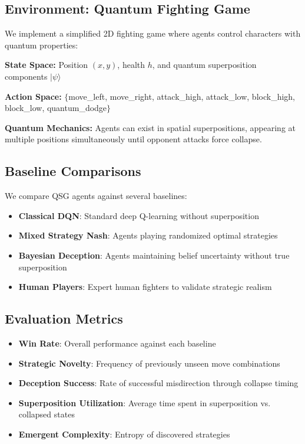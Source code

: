 \documentclass[11pt,a4paper]{article}
\begin{document}
\subsection{Environment: Quantum Fighting Game}

We implement a simplified 2D fighting game where agents control characters with quantum properties:

\textbf{State Space:} Position $(x,y)$, health $h$, and quantum superposition components $|\psi\rangle$

\textbf{Action Space:} $\{$move\_left, move\_right, attack\_high, attack\_low, block\_high, block\_low, quantum\_dodge$\}$

\textbf{Quantum Mechanics:} Agents can exist in spatial superpositions, appearing at multiple positions simultaneously until opponent attacks force collapse.

\subsection{Baseline Comparisons}

We compare QSG agents against several baselines:

\begin{itemize}
\item \textbf{Classical DQN}: Standard deep Q-learning without superposition
\item \textbf{Mixed Strategy Nash}: Agents playing randomized optimal strategies
\item \textbf{Bayesian Deception}: Agents maintaining belief uncertainty without true superposition
\item \textbf{Human Players}: Expert human fighters to validate strategic realism
\end{itemize}

\subsection{Evaluation Metrics}

\begin{itemize}
\item \textbf{Win Rate}: Overall performance against each baseline
\item \textbf{Strategic Novelty}: Frequency of previously unseen move combinations
\item \textbf{Deception Success}: Rate of successful misdirection through collapse timing
\item \textbf{Superposition Utilization}: Average time spent in superposition vs. collapsed states
\item \textbf{Emergent Complexity}: Entropy of discovered strategies
\end{itemize}
\end{document}

